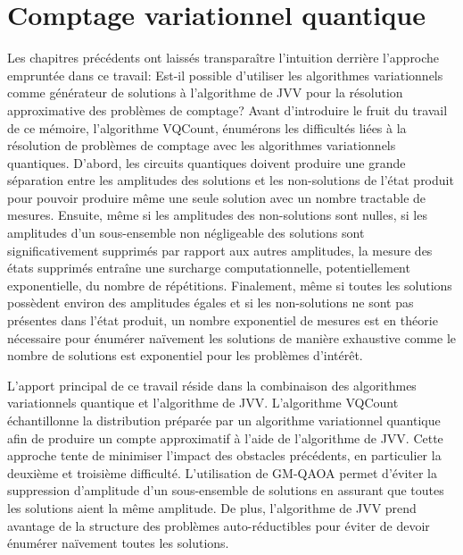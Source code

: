 \chapter{Comptage variationnel quantique}
\label{cha:comptage-variationnel-quantique}

Les chapitres précédents ont laissés transparaître l'intuition derrière l'approche empruntée dans ce travail: Est-il possible d'utiliser les algorithmes variationnels comme générateur de solutions à l'algorithme de JVV pour la résolution approximative des problèmes de comptage? Avant d'introduire le fruit du travail de ce mémoire, l'algorithme VQCount, énumérons les difficultés liées à la résolution de problèmes de comptage avec les algorithmes variationnels quantiques. D'abord, les circuits quantiques doivent produire une grande séparation entre les amplitudes des solutions et les non-solutions de l'état produit pour pouvoir produire même une seule solution avec un nombre tractable de mesures. Ensuite, même si les amplitudes des non-solutions sont nulles, si les amplitudes d'un sous-ensemble non négligeable des solutions sont significativement supprimés par rapport aux autres amplitudes, la mesure des états supprimés entraîne une surcharge computationnelle, potentiellement exponentielle, du nombre de répétitions. Finalement, même si toutes les solutions possèdent environ des amplitudes égales et si les non-solutions ne sont pas présentes dans l'état produit, un nombre exponentiel de mesures est en théorie nécessaire pour énumérer naïvement les solutions de manière exhaustive comme le nombre de solutions est exponentiel pour les problèmes d'intérêt.

L'apport principal de ce travail réside dans la combinaison des algorithmes variationnels quantique et l'algorithme de JVV. L'algorithme VQCount échantillonne la distribution préparée par un algorithme variationnel quantique afin de produire un compte approximatif à l'aide de l'algorithme de JVV. Cette approche tente de minimiser l'impact des obstacles précédents, en particulier la deuxième et troisième difficulté. L'utilisation de GM-QAOA permet d'éviter la suppression d'amplitude d'un sous-ensemble de solutions en assurant que toutes les solutions aient la même amplitude. De plus, l'algorithme de JVV prend avantage de la structure des problèmes auto-réductibles pour éviter de devoir énumérer naïvement toutes les solutions. 

